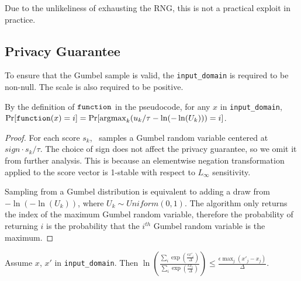 \documentclass{article}
\begin{document}
Due to the unlikeliness of exhausting the RNG, this is not a practical exploit in practice.

\subsection{Privacy Guarantee} 
 
To ensure that the Gumbel sample is valid, the \texttt{input\_domain} is required to be non-null. 
The scale is also required to be positive. 
 
\begin{lemma} 
    \label{function-prob} 
    By the definition of $\texttt{function}$ in the pseudocode, for any $x$ in \texttt{input\_domain}, \\ 
    $\Pr[\texttt{function}(x) = i] = \Pr[\mathrm{argmax}_k (u_k / \tau - \ln(-\ln(U_k))) = i]$. 
\end{lemma} 
 
\begin{proof} 
    For each score $s_k$, \function\ samples a Gumbel random variable centered at $sign \cdot s_k / \tau$. 
    The choice of sign does not affect the privacy guarantee, so we omit it from further analysis. 
    This is because an elementwise negation transformation applied to the score vector is 1-stable with respect to $L_\infty$ sensitivity.

    Sampling from a Gumbel distribution is equivalent to adding a draw from $-\ln(-\ln(U_k))$, where $U_k \sim Uniform(0, 1)$. 
    The algorithm only returns the index of the maximum Gumbel random variable, 
    therefore the probability of returning $i$ is the probability that the $i^{th}$ Gumbel random variable is the maximum. 
\end{proof} 
 
\begin{lemma} 
    \label{priv-inequality} 
    Assume $x$, $x'$ in \texttt{input\_domain}. Then 
    $\ln\left(\frac{\sum_{i} \exp(\frac{\epsilon x'_i}{\Delta})}{\sum_{i} \exp(\frac{\epsilon x_i}{\Delta})}\right) \le \frac{\epsilon \max_j (x'_j - x_j)}{\Delta}$. 
\end{lemma} 
 
\end{document}
